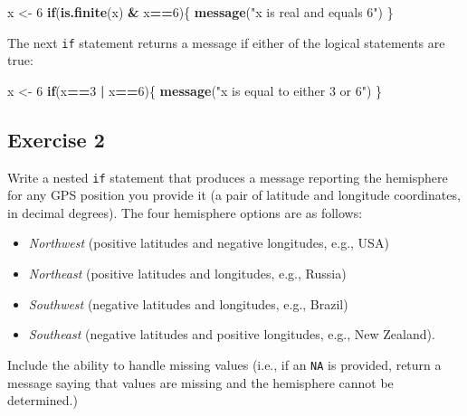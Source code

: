 \documentclass[
]{book}
\newenvironment{Shaded}{\begin{snugshade}}{\end{snugshade}}
\newcommand{\ControlFlowTok}[1]{\textcolor[rgb]{0.13,0.29,0.53}{\textbf{#1}}}
\newcommand{\DecValTok}[1]{\textcolor[rgb]{0.00,0.00,0.81}{#1}}
\newcommand{\KeywordTok}[1]{\textcolor[rgb]{0.13,0.29,0.53}{\textbf{#1}}}
\newcommand{\NormalTok}[1]{#1}
\newcommand{\OperatorTok}[1]{\textcolor[rgb]{0.81,0.36,0.00}{\textbf{#1}}}
\newcommand{\StringTok}[1]{\textcolor[rgb]{0.31,0.60,0.02}{#1}}
\providecommand{\tightlist}{%
  \setlength{\itemsep}{0pt}\setlength{\parskip}{0pt}}
\begin{document}
\begin{Shaded}
\begin{Highlighting}[]
\NormalTok{x <-}\StringTok{ }\DecValTok{6}
\ControlFlowTok{if}\NormalTok{(}\KeywordTok{is.finite}\NormalTok{(x) }\OperatorTok{&}\StringTok{ }\NormalTok{x}\OperatorTok{==}\DecValTok{6}\NormalTok{)\{}
  \KeywordTok{message}\NormalTok{(}\StringTok{"x is real and equals 6"}\NormalTok{)}
\NormalTok{\}}
\end{Highlighting}
\end{Shaded}

The next \texttt{if} statement returns a message if either of the logical statements are true:

\begin{Shaded}
\begin{Highlighting}[]
\NormalTok{x <-}\StringTok{ }\DecValTok{6}
\ControlFlowTok{if}\NormalTok{(x}\OperatorTok{==}\DecValTok{3} \OperatorTok{|}\StringTok{ }\NormalTok{x}\OperatorTok{==}\DecValTok{6}\NormalTok{)\{}
  \KeywordTok{message}\NormalTok{(}\StringTok{"x is equal to either 3 or 6"}\NormalTok{)}
\NormalTok{\}}
\end{Highlighting}
\end{Shaded}

\hypertarget{exercise-2-7}{%
\subsection*{Exercise 2}\label{exercise-2-7}}

Write a nested \texttt{if} statement that produces a message reporting the hemisphere for any GPS position you provide it (a pair of latitude and longitude coordinates, in decimal degrees). The four hemisphere options are as follows:

\begin{itemize}
\tightlist
\item
  \emph{Northwest} (positive latitudes and negative longitudes, e.g., USA)\\
\item
  \emph{Northeast} (positive latitudes and longitudes, e.g., Russia)
\item
  \emph{Southwest} (negative latitudes and longitudes, e.g., Brazil)\\
\item
  \emph{Southeast} (negative latitudes and positive longitudes, e.g., New Zealand).
\end{itemize}

Include the ability to handle missing values (i.e., if an \texttt{NA} is provided, return a message saying that values are missing and the hemisphere cannot be determined.)
\end{document}
